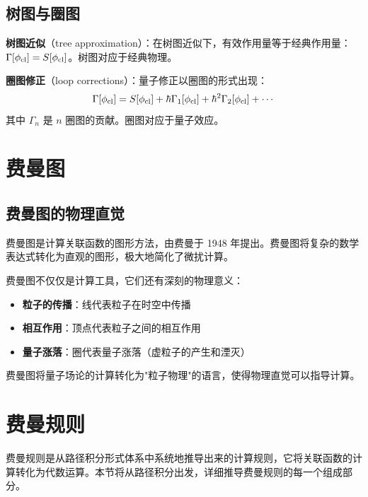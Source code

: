 \subsection{树图与圈图}

\begin{remark}[树图与圈图]
\textbf{树图近似}（tree approximation）：在树图近似下，有效作用量等于经典作用量：$\Gamma[\phi_{\rm cl}] = S[\phi_{\rm cl}]$。树图对应于经典物理。

\textbf{圈图修正}（loop corrections）：量子修正以圈图的形式出现：
\begin{equation}
    \Gamma[\phi_{\rm cl}] = S[\phi_{\rm cl}] + \hbar \Gamma_1[\phi_{\rm cl}] + \hbar^2 \Gamma_2[\phi_{\rm cl}] + \cdots
\end{equation}
其中 $\Gamma_n$ 是 $n$ 圈图的贡献。圈图对应于量子效应。
\end{remark}

\section{费曼图}

\subsection{费曼图的物理直觉}

费曼图是计算关联函数的图形方法，由费曼于 1948 年提出。费曼图将复杂的数学表达式转化为直观的图形，极大地简化了微扰计算。

\begin{note}[费曼图的物理意义]
费曼图不仅仅是计算工具，它们还有深刻的物理意义：
\begin{itemize}
    \item \textbf{粒子的传播}：线代表粒子在时空中传播
    \item \textbf{相互作用}：顶点代表粒子之间的相互作用
    \item \textbf{量子涨落}：圈代表量子涨落（虚粒子的产生和湮灭）
\end{itemize}
费曼图将量子场论的计算转化为"粒子物理"的语言，使得物理直觉可以指导计算。
\end{note}

\section{费曼规则}

费曼规则是从路径积分形式体系中系统地推导出来的计算规则，它将关联函数的计算转化为代数运算。本节将从路径积分出发，详细推导费曼规则的每一个组成部分。

